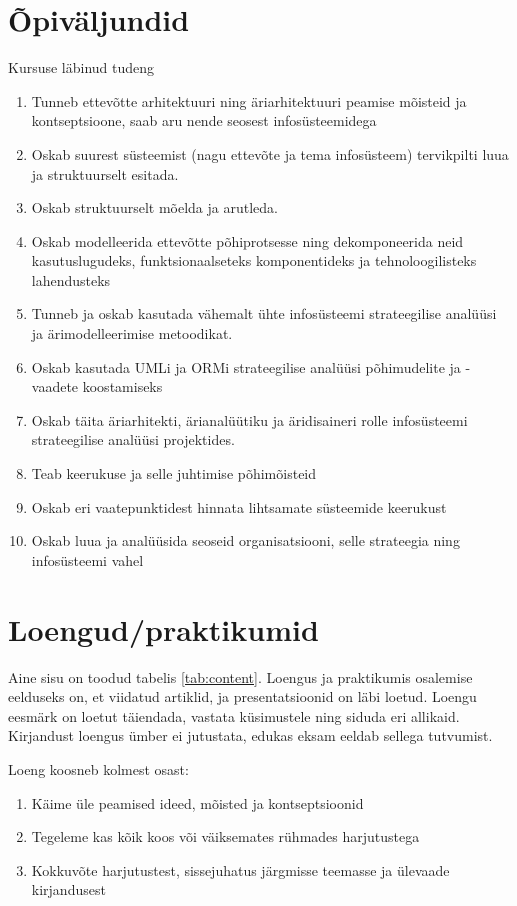 \documentclass[nobib]{tufte-handout}
\begin{document}
\section{Õpiväljundid}
Kursuse läbinud tudeng 
\begin{enumerate}
	\item Tunneb ettevõtte arhitektuuri ning äriarhitektuuri peamise mõisteid ja kontseptsioone, saab aru nende seosest infosüsteemidega 
	\item Oskab suurest süsteemist (nagu ettevõte ja tema infosüsteem) tervikpilti luua ja struktuurselt esitada. 
	\item Oskab struktuurselt mõelda ja arutleda. 
	\item Oskab modelleerida ettevõtte põhiprotsesse ning dekomponeerida neid kasutuslugudeks, funktsionaalseteks komponentideks ja tehnoloogilisteks lahendusteks
	\item Tunneb ja oskab kasutada vähemalt ühte infosüsteemi strateegilise analüüsi ja ärimodelleerimise metoodikat. 
	\item Oskab kasutada UMLi ja ORMi strateegilise analüüsi põhimudelite ja -vaadete koostamiseks 
	\item Oskab täita äriarhitekti, ärianalüütiku ja äridisaineri rolle infosüsteemi strateegilise analüüsi projektides. 
	\item Teab keerukuse ja selle juhtimise põhimõisteid
	\item Oskab eri vaatepunktidest hinnata lihtsamate süsteemide keerukust
	\item Oskab luua ja analüüsida seoseid organisatsiooni, selle strateegia ning infosüsteemi vahel
\end{enumerate}

\section{Loengud/praktikumid}
Aine sisu on toodud tabelis \ref{tab:content}. Loengus ja praktikumis osalemise eelduseks on, et viidatud artiklid, ja presentatsioonid on läbi loetud. Loengu eesmärk on loetut täiendada, vastata küsimustele ning siduda eri allikaid. Kirjandust loengus ümber ei jutustata, edukas eksam eeldab sellega tutvumist. 

Loeng koosneb kolmest osast:
\begin{enumerate}
	\item Käime üle peamised ideed, mõisted ja kontseptsioonid
	\item Tegeleme kas kõik koos või väiksemates rühmades harjutustega
	\item Kokkuvõte harjutustest, sissejuhatus järgmisse teemasse ja ülevaade kirjandusest
\end{enumerate}
\end{document}
